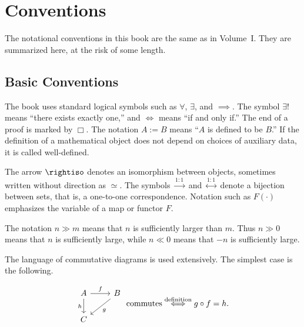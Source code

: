
\section*{Conventions}
\hypertarget{o014.aljabr2.prelude.conventions}{ }

The notational conventions in this book are the same as in Volume~I. They are summarized here, at the risk of some length.

\subsection*{Basic Conventions}

The book uses standard logical symbols such as $\forall$, $\exists$, and $\implies$. The symbol $\exists !$ means ``there exists exactly one,'' and $\iff$ means ``if and only if.'' The end of a proof is marked by $\Box$. The notation $A:=B$ means ``$A$ is defined to be $B$.'' If the definition of a mathematical object does not depend on choices of auxiliary data, it is called well-defined.

The arrow $\rightiso$ denotes an isomorphism between objects, sometimes written without direction as $\simeq$. The symbols $\xrightarrow{1:1}$ and $\stackrel{1:1}{\longleftrightarrow}$ denote a bijection between sets, that is, a one-to-one correspondence. Notation such as $F(\cdot)$ emphasizes the variable of a map or functor $F$.

The notation $n\gg m$ means that $n$ is sufficiently larger than $m$. Thus $n\gg0$ means that $n$ is sufficiently large, while $n\ll0$ means that $-n$ is sufficiently large.

The language of commutative diagrams is used extensively. The simplest case is the following.

\[\begin{tikzcd}
	A \arrow[r, "f"] \arrow[d, "h"'] & B \arrow[ld, "g"] \\
	C &
\end{tikzcd} \; \text{commutes} \stackrel{\text{definition}}{\iff} g \circ f = h. \]

